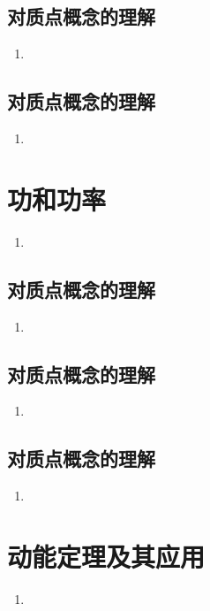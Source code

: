 \documentclass[cn,11pt]{elegantbook}
\begin{document}
\section{对质点概念的理解}
\begin{enumerate}
   \item 
\end{enumerate}

\section{对质点概念的理解}
\begin{enumerate}
   \item 
\end{enumerate}


\chapter{功和功率}
\begin{enumerate}
   \item 
\end{enumerate}

\section{对质点概念的理解}
\begin{enumerate}
   \item 
\end{enumerate}

\section{对质点概念的理解}
\begin{enumerate}
   \item 
\end{enumerate}

\section{对质点概念的理解}
\begin{enumerate}
   \item 
\end{enumerate}


\chapter{动能定理及其应用}
\begin{enumerate}
   \item 
\end{enumerate}
\end{document}
